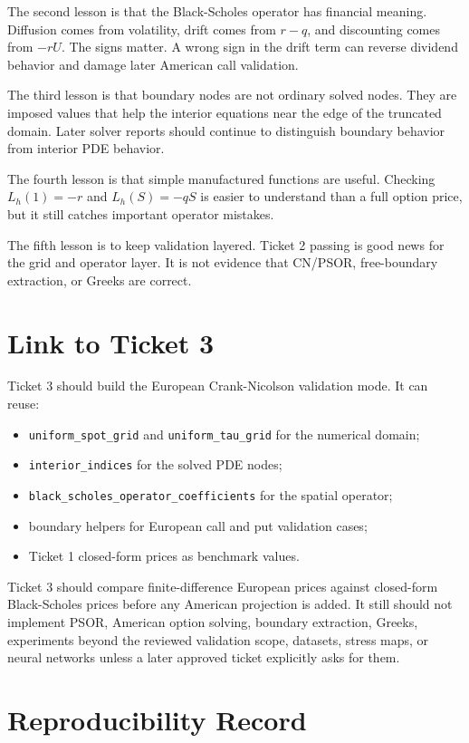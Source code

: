 \documentclass[11pt,a4paper]{article}
\newcommand{\code}[1]{\texttt{#1}}
\begin{document}
The second lesson is that the Black-Scholes operator has financial meaning. Diffusion comes from
volatility, drift comes from \(r-q\), and discounting comes from \(-rU\). The signs matter.
A wrong sign in the drift term can reverse dividend behavior and damage later American call
validation.

The third lesson is that boundary nodes are not ordinary solved nodes. They are imposed values
that help the interior equations near the edge of the truncated domain. Later solver reports
should continue to distinguish boundary behavior from interior PDE behavior.

The fourth lesson is that simple manufactured functions are useful. Checking \(L_h(1)=-r\) and
\(L_h(S)=-qS\) is easier to understand than a full option price, but it still catches important
operator mistakes.

The fifth lesson is to keep validation layered. Ticket 2 passing is good news for the grid and
operator layer. It is not evidence that CN/PSOR, free-boundary extraction, or Greeks are correct.

\section{Link to Ticket 3}

Ticket 3 should build the European Crank-Nicolson validation mode. It can reuse:
\begin{itemize}
  \item \code{uniform\_spot\_grid} and \code{uniform\_tau\_grid} for the numerical domain;
  \item \code{interior\_indices} for the solved PDE nodes;
  \item \code{black\_scholes\_operator\_coefficients} for the spatial operator;
  \item boundary helpers for European call and put validation cases;
  \item Ticket 1 closed-form prices as benchmark values.
\end{itemize}

Ticket 3 should compare finite-difference European prices against closed-form Black-Scholes
prices before any American projection is added. It still should not implement PSOR, American
option solving, boundary extraction, Greeks, experiments beyond the reviewed validation scope,
datasets, stress maps, or neural networks unless a later approved ticket explicitly asks for them.

\section{Reproducibility Record}
\end{document}
